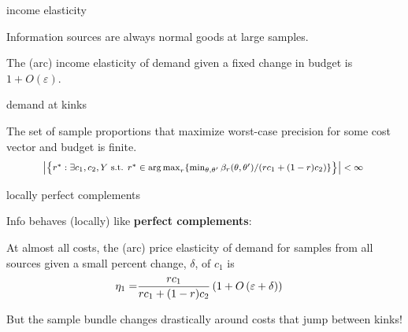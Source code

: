 \documentclass[square,]{gBakerBeamer}
\renewcommand{\|}{\,|\,}
\DeclareMathOperator*{\argmax}{arg\,max}
\begin{document}
\begin{frame}{income elasticity}

  Information sources are always normal goods at large samples.\bigskip

  \begin{corollary}
    The (arc) income elasticity of demand given a fixed change in budget is $1+O(\varepsilon)$.
  \end{corollary}

  \note{%

  }
\end{frame}


\begin{frame}[label=maximin-prec]{demand at kinks}

  \begin{proposition}
    The set of sample proportions that maximize worst-case precision for some cost vector and budget is finite.
    \begin{equation*}
      \mbox{\footnotesize $\left|\left\{ r^{*} : \exists c_1,c_2,Y \text{ s.t. }
            r^{*}\in \argmax_{r} \{\min_{\theta,\theta'}\beta_r(\theta,\theta')/(rc_1+(1-r)c_2)\}
          \right\}\right|
        < \infty$ }
    \end{equation*}
  \end{proposition}

  \note{%

  }
\end{frame}


\begin{frame}{locally perfect complements}

  Info behaves (locally) like \textbf{perfect complements}:

  \begin{corollary}
    At almost all costs, the (arc) price elasticity of demand for samples from all sources given a small percent change, $\delta$, of $c_1$ is
    \begin{align*}
      \eta_1 =& { rc_1 \over rc_1 + (1-r)c_2 }\left( 1 + O \left( \varepsilon + \delta \right) \right)
    \end{align*}
  \end{corollary}\pause

  But the sample bundle changes drastically around costs that jump between kinks!

  \note{%

  }
\end{frame}
\end{document}
